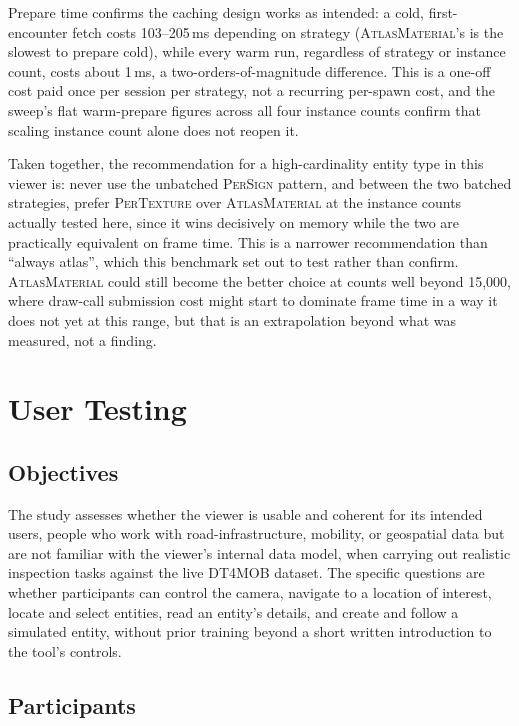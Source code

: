 Prepare time confirms the caching design works as intended: a cold, first-encounter fetch costs 103--205\,ms depending on strategy (\textsc{AtlasMaterial}'s is the slowest to prepare cold), while every warm run, regardless of strategy or instance count, costs about 1\,ms, a two-orders-of-magnitude difference. This is a one-off cost paid once per session per strategy, not a recurring per-spawn cost, and the sweep's flat warm-prepare figures across all four instance counts confirm that scaling instance count alone does not reopen it.

Taken together, the recommendation for a high-cardinality entity type in this viewer is: never use the unbatched \textsc{PerSign} pattern, and between the two batched strategies, prefer \textsc{PerTexture} over \textsc{AtlasMaterial} at the instance counts actually tested here, since it wins decisively on memory while the two are practically equivalent on frame time. This is a narrower recommendation than ``always atlas'', which this benchmark set out to test rather than confirm. \textsc{AtlasMaterial} could still become the better choice at counts well beyond 15,000, where draw-call submission cost might start to dominate frame time in a way it does not yet at this range, but that is an extrapolation beyond what was measured, not a finding.

\section{User Testing}
\label{sec:eval-user-testing}

\subsection{Objectives}

The study assesses whether the viewer is usable and coherent for its intended users, people who work with road-infrastructure, mobility, or geospatial data but are not familiar with the viewer's internal data model, when carrying out realistic inspection tasks against the live DT4MOB dataset. The specific questions are whether participants can control the camera, navigate to a location of interest, locate and select entities, read an entity's details, and create and follow a simulated entity, without prior training beyond a short written introduction to the tool's controls.

\subsection{Participants}

